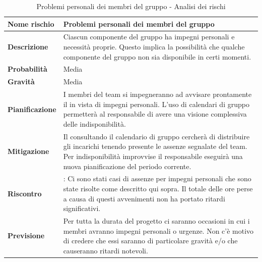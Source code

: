 \documentclass[12pt,a4paper]{article}
\begin{document}
\begin{table}[H]
	\begin{center}
		\begin{tabular}{p{} p{}}
			\toprule
			\textbf{Nome rischio} & \textbf{Problemi personali dei membri del gruppo} \\
			\midrule
			\midrule
			\textbf{Descrizione} & Ciascun componente del gruppo ha impegni personali e necessità proprie. Questo implica la possibilità che qualche componente del gruppo non sia disponibile in certi momenti. \\
			\midrule
			\textbf{Probabilità} & Media \\
			\midrule
			\textbf{Gravità} & Media \\
			\midrule
			\textbf{Pianificazione} & I membri del team si impegneranno ad avvisare prontamente il \PM{} in vista di impegni personali. L’uso di calendari di gruppo permetterà al responsabile di avere una visione complessiva delle indisponibilità.  \\
			\midrule
			\textbf{Mitigazione} & Il \PM{} consultando il calendario di gruppo cercherà di distribuire gli incarichi tenendo presente le assenze segnalate del team. Per indisponibilità improvvise il responsabile eseguirà una nuova pianificazione del periodo corrente. \\
			\midrule
			\textbf{Riscontro} & \textbf{\FA{}}: Ci sono stati casi di assenze per impegni personali che sono state risolte come descritto qui sopra. Il totale delle ore perse a causa di questi avvenimenti non ha portato ritardi significativi. \\
			\midrule
			\textbf{Previsione} & Per tutta la durata del progetto ci saranno occasioni in cui i membri avranno impegni personali o urgenze. Non c'è motivo di credere che essi saranno di particolare gravità e/o che causeranno ritardi notevoli. \\
			\bottomrule
		\end{tabular}
		\caption{Problemi personali dei membri del gruppo - Analisi dei rischi}
	\end{center}
\end{table}
\end{document}
